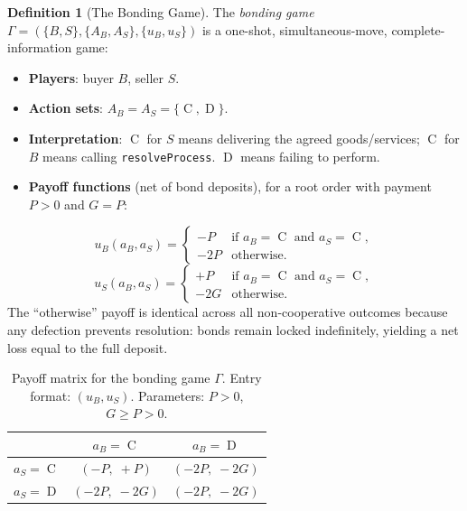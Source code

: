 \documentclass[11pt,a4paper]{article}
\theoremstyle{definition}
\newtheorem{definition}[theorem]{Definition}
\theoremstyle{remark}
\newcommand{\pay}{P}           %
\newcommand{\cumval}{G}        %
\newcommand{\ub}{u_B}          %
\newcommand{\us}{u_S}          %
\DeclareMathOperator{\Coop}{C}
\DeclareMathOperator{\Def}{D}
\begin{document}
\begin{definition}[The Bonding Game]
\label{def:bonding-game}
The \emph{bonding game} $\Gamma = (\{B, S\}, \{A_B, A_S\}, \{\ub, \us\})$
is a one-shot, simultaneous-move, complete-information game:
\begin{itemize}
  \item \textbf{Players}: buyer $B$, seller $S$.
  \item \textbf{Action sets}: $A_B = A_S = \{\Coop, \Def\}$.
  \item \textbf{Interpretation}: $\Coop$ for $S$ means delivering the
    agreed goods/services; $\Coop$ for $B$ means calling
    \texttt{resolveProcess}. $\Def$ means failing to perform.
  \item \textbf{Payoff functions} (net of bond deposits), for a root
    order with payment $\pay > 0$ and $\cumval = \pay$:
\end{itemize}
\begin{equation}\label{eq:utility-buyer}
  \ub(a_B, a_S) =
  \begin{cases}
    -\pay & \text{if } a_B = \Coop \text{ and } a_S = \Coop, \\
    -2\pay & \text{otherwise}.
  \end{cases}
\end{equation}
\begin{equation}\label{eq:utility-seller}
  \us(a_B, a_S) =
  \begin{cases}
    +\pay & \text{if } a_B = \Coop \text{ and } a_S = \Coop, \\
    -2\cumval & \text{otherwise}.
  \end{cases}
\end{equation}
The ``otherwise'' payoff is identical across all non-cooperative
outcomes because any defection prevents resolution: bonds remain locked
indefinitely, yielding a net loss equal to the full deposit.
\end{definition}

\begin{table}[ht]
\centering
\caption{Payoff matrix for the bonding game $\Gamma$.
Entry format: $(\ub, \us)$. Parameters: $\pay > 0$,
$\cumval \geq \pay > 0$.}
\label{tab:payoff-matrix}
\begin{tabular}{lcc}
\toprule
 & $a_B = \Coop$ & $a_B = \Def$ \\
\midrule
$a_S = \Coop$ & $(-\pay,\; +\pay)$ & $(-2\pay,\; -2\cumval)$ \\
$a_S = \Def$  & $(-2\pay,\; -2\cumval)$ & $(-2\pay,\; -2\cumval)$ \\
\bottomrule
\end{tabular}
\end{table}
\end{document}
